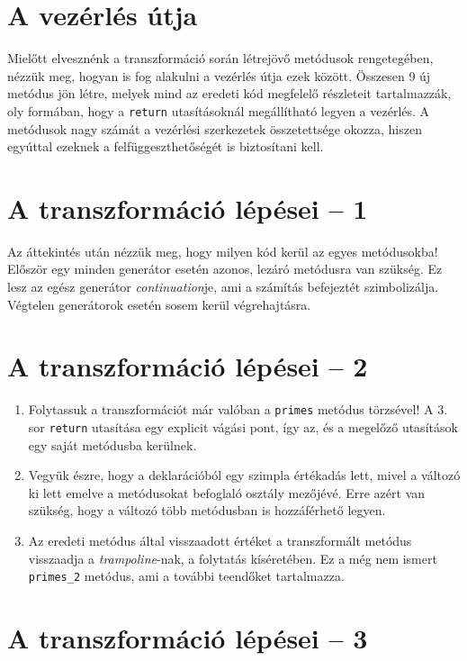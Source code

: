 \documentclass[12pt, a4paper]{article}
\begin{document}
\section{A vezérlés útja}

Mielőtt elvesznénk a transzformáció során létrejövő metódusok rengetegében, nézzük meg, hogyan is fog alakulni a vezérlés útja ezek között. Összesen 9 új metódus jön létre, melyek mind az eredeti kód megfelelő részleteit tartalmazzák, oly formában, hogy a \texttt{return} utasításoknál megállítható legyen a vezérlés. A metódusok nagy számát a vezérlési szerkezetek összetettsége okozza, hiszen egyúttal ezeknek a felfüggeszthetőségét is biztosítani kell.

\section{A transzformáció lépései -- 1}

Az áttekintés után nézzük meg, hogy milyen kód kerül az egyes metódusokba! Először egy minden generátor esetén azonos, lezáró metódusra van szükség. Ez lesz az egész generátor \textit{continuation}je, ami a számítás befejeztét szimbolizálja. Végtelen generátorok esetén sosem kerül végrehajtásra.

\section{A transzformáció lépései -- 2} 

\begin{enumerate}
    \item
    Folytassuk a transzformációt már valóban a \texttt{primes} metódus törzsével! A 3. sor \texttt{return} utasítása egy explicit vágási pont, így az, és a megelőző utasítások egy saját metódusba kerülnek.
    \item
    Vegyük észre, hogy a deklarációból egy szimpla értékadás lett, mivel a változó ki lett emelve a metódusokat befoglaló osztály mezőjévé. Erre azért van szükség, hogy a változó több metódusban is hozzáférhető legyen.
    \item
    Az eredeti metódus által visszaadott értéket a transzformált metódus visszaadja a \textit{trampoline}-nak, a folytatás kíséretében. Ez a még nem ismert \texttt{primes\_2} metódus, ami a további teendőket tartalmazza.
\end{enumerate}

\section{A transzformáció lépései -- 3}
\end{document}
